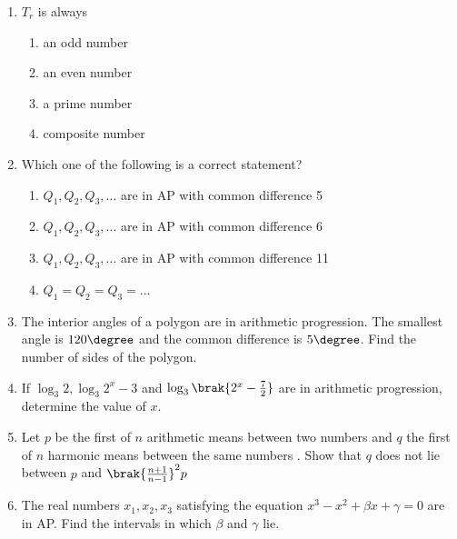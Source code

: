 \begin{enumerate}    [label=\thesubsection.\arabic*, ref=\thesubsection.\theenumi]
\begin{multicols}{2}
\begin{enumerate}
	     \item $\frac{1}{12}n\brak{n+1}\brak{3n^{2}+n+2}$
	     \item $\frac{1}{2}n\brak{2n^{2}-n+1}$
	     \item $\frac{1}{3}\brak{2n^{3}-2n+3}$
    \end{enumerate}
\end{multicols} 
%
  \item $T_{r}$ is always 
%                           
	  \hfill {}                    
                  \begin{multicols}{2}      
\begin{enumerate}     
%	
       \item an odd number 
       \item an even number
	\item a prime number 
        \item composite number
%
	  \end{enumerate}
   \end{multicols}
    \item Which one of the following is a correct statement? 
%          
	    \hfill {}                                  
\begin{enumerate}    
	\item $Q_{1}, Q_{2}, Q_{3}, \dots$ are in AP with common difference 5 
	\item $Q_{1}, Q_{2}, Q_{3}, \dots$ are in AP with common difference 6
	\item $Q_{1}, Q_{2}, Q_{3}, \dots$ are in AP with common difference 11
	\item $Q_{1}=Q_{2}=Q_{3}=\dots$
	\end{enumerate}
%       
%
\item The interior angles of a polygon are in arithmetic progression. The smallest angle is $120\degree$ and the common difference is $5\degree$. Find the number of sides of the polygon.
%
\hfill{}
%
%
%	    
	     \item If $ \log_{3}{2}, \log_{3}{2^{x}-3} $ and $ \log_{3}{\brak{2^{x}-\frac{7}{2}}} $ are in arithmetic progression, determine the value of $x$.  
%     
	      \hfill {}
%      
%
      \item Let $p$ be the first of $n$ arithmetic means between two numbers and $q$ the first of $n$ harmonic means between the same numbers . Show that $q$ does not lie between $p$ and $\brak{\frac{n+1}{n-1}}^{2}p$ 
%       
	      \hfill {}
%      
%
%       
%
		\item  The real numbers $ x_{1}, x_{2}, x_{3} $ satisfying the equation $ x^{3}-x^{2}+\beta x+\gamma=0 $ are in AP. Find the intervals in which $ \beta $ and $\gamma$ lie.

\end{enumerate}
